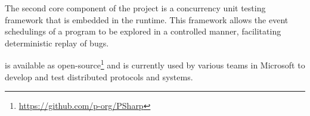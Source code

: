 The second core component of the \psharp project is a concurrency unit testing framework that is embedded in the \psharp runtime. This framework allows the event schedulings of a \psharp program to be explored in a controlled manner, facilitating deterministic replay of bugs.

\psharp is available as open-source\footnote{\url{https://github.com/p-org/PSharp}} and is currently used by various teams in Microsoft to develop and test distributed protocols and systems.



